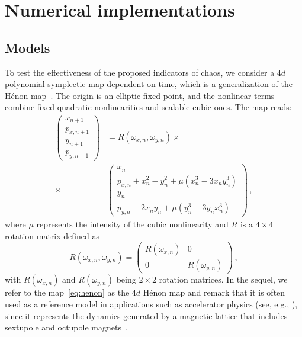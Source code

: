 %
\section{\label{sec:numerical_implementations} Numerical implementations}
%
\subsection{Models}
%
To test the effectiveness of the proposed indicators of chaos, we consider a $4d$ polynomial symplectic map dependent on time, which is a generalization of the Hénon map~\cite{Yellow}. The origin is an elliptic fixed point, and the nonlinear terms combine fixed quadratic nonlinearities and scalable cubic ones. The map reads:
\begin{equation}
    \begin{split}
    \left(\begin{array}{c}
    x_{n+1} \\
    p_{x, n+1} \\
    y_{n+1} \\
    p_{y, n+1}
    \end{array}\right) & =R(\omega_{x,n}, \omega_{y, n}) \times \\ 
    \times & \left(\begin{array}{c}
    x_{n} \\
    p_{x, n}+x_{n}^{2}-y_{n}^{2} + \mu \left(x_{n}^{3} - 3x_{n}y_{n}^{3}\right) \\
    y_{n} \\
    p_{y, n}-2 x_{n} y_{n} + \mu \left(y_{n}^{3} - 3y_{n} x_{n}^{3}\right)
    \end{array}\right) \,,
    \end{split}
    \label{eq:henon}
\end{equation}
where $\mu$ represents the intensity of the cubic nonlinearity and $R$ is a $4\times 4$ rotation matrix defined as
\begin{equation}
    R(\omega_{x,n}, \omega_{y, n})=\left(\begin{array}{cc}
    R\left(\omega_{x, n}\right) & 0 \\
    0 & R\left(\omega_{y, n}\right)
    \end{array}\right) \,,
\end{equation}
with $R\left(\omega_{x, n}\right)$ and $R\left(\omega_{y, n}\right)$ being $2\times 2$ rotation matrices. In the sequel, we refer to the map~\eqref{eq:henon} as the $4d$ Hénon map and remark that it is often used as a reference model in applications such as accelerator physics (see, e.g., \cite{Yellow, invlog, Bazzani:2019csk}), since it represents the dynamics generated by a magnetic lattice that includes sextupole and octupole magnets~\cite{Yellow}.

